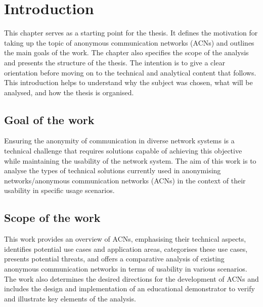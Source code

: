 \chapter{Introduction}
\label{chap:Introduction}
This chapter serves as a starting point for the thesis. It defines the motivation for taking up the topic of anonymous communication networks (ACNs) and outlines the main goals of the work. The chapter also specifies the scope of the analysis and presents the structure of the thesis. The intention is to give a clear orientation before moving on to the technical and analytical content that follows. This introduction helps to understand why the subject was chosen, what will be analysed, and how the thesis is organised.

\section{Goal of the work}
Ensuring the anonymity of communication in diverse network systems is a technical challenge that requires solutions capable of achieving this objective while maintaining the usability of the network system. The aim of this work is to analyse the types of technical solutions currently used in anonymising networks/anonymous communication networks (ACNs) in the context of their usability in specific usage scenarios.

\section{Scope of the work}
This work provides an overview of ACNs, emphasising their technical aspects, identifies potential use cases and application areas, categorises these use cases, presents potential threats, and offers a comparative analysis of existing anonymous communication networks in terms of usability in various scenarios. The work also determines the desired directions for the development of ACNs and includes the design and implementation of an educational demonstrator to verify and illustrate key elements of the analysis.

